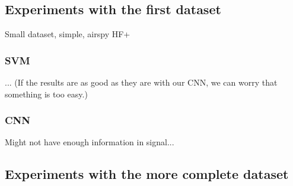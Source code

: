 \subsection{Experiments with the first dataset}

Small dataset, simple, airspy HF+

\subsubsection{SVM}

... (If the results are as good as they are with our CNN, we can worry that something is too easy.)

\subsubsection{CNN}

Might not have enough information in signal...

\subsection{Experiments with the more complete dataset}


